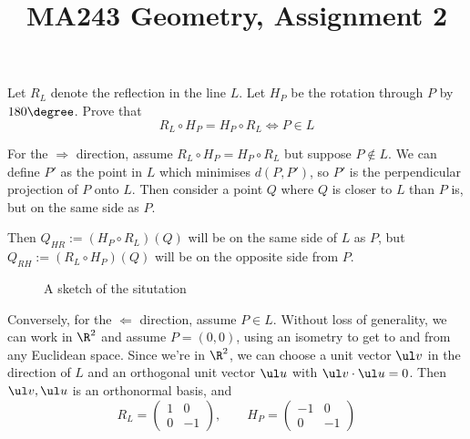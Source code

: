 \documentclass[a4paper]{article}
\title{MA243 Geometry, Assignment 2}
\begin{document}
\maketitle

\setlength{\parindent}{0em}
\setlength{\parskip}{1em}


\begin{questionbody}
%
Let $R_L$ denote the reflection in the line $L$. Let $H_P$ be the rotation through $P$ by $180\degree$. Prove that \[
R_L \circ H_P = H_P \circ R_L \iff P \in L
\]
\end{questionbody}

For the $\Rightarrow$ direction, assume $R_L \circ H_P = H_P \circ R_L$ but suppose $P \notin L$. We can define $P'$ as the point in $L$ which minimises $d(P, P')$, so $P'$ is the perpendicular projection of $P$ onto $L$. Then consider a point $Q$ where $Q$ is closer to $L$ than $P$ is, but on the same side as $P$.

Then $Q_{HR} := (H_P \circ R_L)(Q)$ will be on the same side of $L$ as $P$, but $Q_{RH} := (R_L \circ H_P)(Q)$ will be on the opposite side from $P$.

\begin{figure}[tbph]
\centering
{}
\caption{A sketch of the situtation}
\end{figure}

Conversely, for the $\Leftarrow$ direction, assume $P \in L$. Without loss of generality, we can work in $\R^2$ and assume $P = (0, 0)$, using an isometry to get to and from any Euclidean space. Since we're in $\R^2$, we can choose a unit vector $\ul v$ in the direction of $L$ and an orthogonal unit vector $\ul u$ with $\ul v \cdot \ul u = 0$. Then $\ul v, \ul u$ is an orthonormal basis, and \[
R_L = \begin{pmatrix} 1 & 0 \\ 0 & -1 \end{pmatrix},
\qquad H_P = \begin{pmatrix} -1 & 0 \\ 0 & -1 \end{pmatrix}
\]
\end{document}
